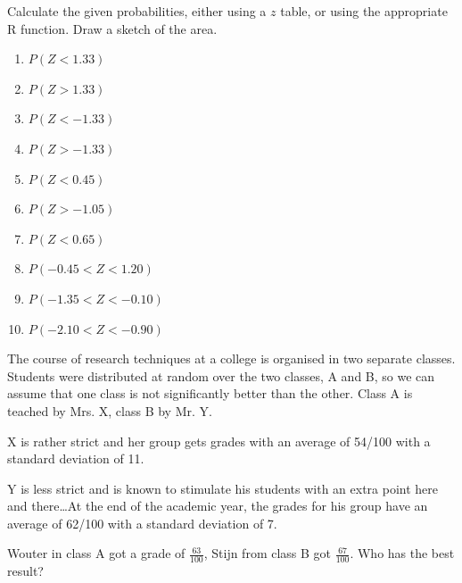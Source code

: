 %  

\begin{exercise}
  Calculate the given probabilities, either using a $z$ table, or using the appropriate R function. Draw a sketch of the area.
  
  \begin{enumerate}[label=\alph*.]
    \item $P(Z < 1.33)$
    \item $P(Z > 1.33)$
    \item $P(Z < -1.33)$
    \item $P(Z > -1.33)$
    \item $P(Z < 0.45)$
    \item $P(Z > -1.05)$
    \item $P(Z < 0.65)$
    \item $P(-0.45 < Z < 1.20)$
    \item $P(-1.35 < Z < -0.10)$
    \item $P(-2.10 < Z < -0.90)$
  \end{enumerate}
\end{exercise}

\begin{exercise}
  The course of research techniques at a college is organised in two separate classes. Students were distributed at random over the two classes, A and B, so we can assume that one class is not significantly better than the other. Class A is teached by Mrs. X, class B by Mr. Y.
  
  X is rather strict and her group gets grades with an average of 54/100 with a standard deviation of 11.
  
  Y is less strict and is known to stimulate his students with an extra point here and there\ldots At the end of the academic year, the grades for his group have an average of 62/100 with a standard deviation of 7.
  
  Wouter in class A got a grade of $\frac{63}{100}$, Stijn from class B got $\frac{67}{100}$. Who has the best result?
\end{exercise}

